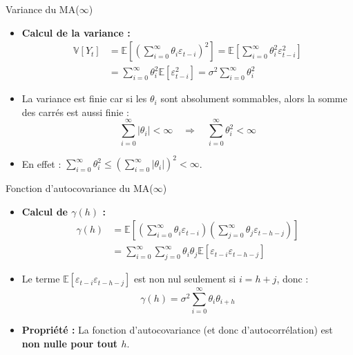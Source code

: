 \documentclass[11pt,aspectratio=169]{beamer}
\newcommand{\E}{\mathbb{E}}
\newcommand{\Var}{\mathbb{V}}
\begin{document}
\begin{frame}{Variance du MA($\infty$)}

\begin{itemize}

\item \textbf{Calcul de la variance :}
\begin{align*}
\Var[Y_t] &= \E\left[\left(\sum_{i=0}^{\infty} \theta_i \varepsilon_{t-i}\right)^2\right] = \E\left[\sum_{i=0}^{\infty} \theta_i^2 \varepsilon_{t-i}^2\right] \\
&= \sum_{i=0}^{\infty} \theta_i^2 \E[\varepsilon_{t-i}^2] = \sigma^2 \sum_{i=0}^{\infty} \theta_i^2
\end{align*}

\item La variance est finie car si les $\theta_i$ sont absolument sommables, alors la somme des carrés est aussi finie :
\[
\sum_{i=0}^{\infty} |\theta_i| < \infty \quad \Rightarrow \quad \sum_{i=0}^{\infty} \theta_i^2 < \infty
\]

\item En effet : $\sum_{i=0}^{\infty} \theta_i^2 \leq \left(\sum_{i=0}^{\infty} |\theta_i|\right)^2 < \infty$.

\end{itemize}
\end{frame}

\begin{frame}{Fonction d'autocovariance du MA($\infty$)}

\begin{itemize}

\item \textbf{Calcul de $\gamma(h)$ :}
\begin{align*}
\gamma(h) &= \E\left[\left(\sum_{i=0}^{\infty} \theta_i \varepsilon_{t-i}\right) \left(\sum_{j=0}^{\infty} \theta_j \varepsilon_{t-h-j}\right)\right] \\
&= \sum_{i=0}^{\infty} \sum_{j=0}^{\infty} \theta_i \theta_j \E[\varepsilon_{t-i} \varepsilon_{t-h-j}]
\end{align*}

\item Le terme $\E[\varepsilon_{t-i} \varepsilon_{t-h-j}]$ est non nul seulement si $i = h + j$, donc :
\[
\boxed{\gamma(h) = \sigma^2 \sum_{i=0}^{\infty} \theta_i \theta_{i+h}}
\]

\item \textbf{Propriété :} La fonction d'autocovariance (et donc d'autocorrélation) est \textbf{non nulle pour tout $h$}.

\end{itemize}
\end{frame}
\end{document}
